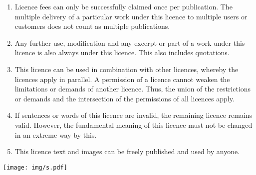 \documentclass[a4paper,8pt]{extarticle}
\begin{document}
\begin{enumerate}
 \item Licence fees can only be successfully claimed once per publication. The multiple delivery of a particular work under this licence to multiple users or customers does not count as multiple publications.

 \item Any further use, modification and any excerpt or part of a work under this licence is also always under this licence. This also includes quotations.

 \item This licence can be used in combination with other licences, whereby the licences apply in parallel. A permission of a licence cannot weaken the limitations or demands of another licence. Thus, the union of the restrictions or demands and the intersection of the permissions of all licences apply.

 \item If sentences or words of this licence are invalid, the remaining licence remains valid. However, the fundamental meaning of this licence must not be changed in an extreme way by this.

 \item This licence text and images can be freely published and used by anyone.
\end{enumerate}

\begin{center}\texttt{[image: img/s.pdf]}\end{center}
\end{document}
